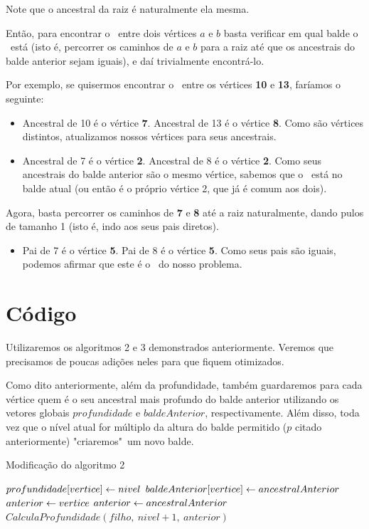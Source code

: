 Note que o ancestral da raiz é naturalmente ela mesma.

Então, para encontrar o \LCA\ entre dois vértices $a$ e $b$ basta verificar em qual balde o \LCA\ está (isto é, percorrer os caminhos de $a$ e $b$ para a raiz até que os ancestrais do balde anterior sejam iguais), e daí trivialmente encontrá-lo.

Por exemplo, se quisermos encontrar o \LCA\ entre os vértices \textbf{10} e \textbf{13}, faríamos o seguinte:

\begin{itemize}
    \item Ancestral de 10 é o vértice \textbf{7}. Ancestral de 13 é o vértice \textbf{8}. Como são vértices distintos, atualizamos nossos vértices para seus ancestrais.
    \item Ancestral de 7 é o vértice \textbf{2}. Ancestral de 8 é o vértice \textbf{2}. Como seus ancestrais do balde anterior são o mesmo vértice, sabemos que o \LCA\ está no balde atual (ou então é o próprio vértice 2, que já é comum aos dois).
\end{itemize}
Agora, basta percorrer os caminhos de \textbf{7} e \textbf{8} até a raiz naturalmente, dando pulos de tamanho 1 (isto é, indo aos seus pais diretos).
\begin{itemize}
    \item Pai de 7 é o vértice \textbf{5}. Pai de 8 é o vértice \textbf{5}. Como seus pais são iguais, podemos afirmar que este é o \LCA\ do nosso problema.
\end{itemize}

\section{Código}

Utilizaremos os algoritmos 2 e 3 demonstrados anteriormente. Veremos que precisamos de poucas adições neles para que fiquem otimizados.

Como dito anteriormente, além da profundidade, também guardaremos para cada vértice quem é o seu ancestral mais profundo do balde anterior utilizando os vetores globais $profundidade$ e $baldeAnterior$, respectivamente. Além disso, toda vez que o nível atual for múltiplo da altura do balde permitido ($p$ citado anteriormente)  "criaremos"\ um novo balde.

\vspace{0.3cm}

\begin{algorithm}[H]
\caption{Modificação do algoritmo 2}
\begin{algorithmic}[1]
    \State $profundidade[vertice] \leftarrow nivel$
    \State $baldeAnterior[vertice] \leftarrow ancestralAnterior$
        \State $anterior \leftarrow vertice$
    \Else
        \State $anterior \leftarrow ancestralAnterior$
    \EndIf
        \State $CalculaProfundidade(filho,\ nivel+1,\ anterior)$
    \EndFor
\EndFunction
\end{algorithmic}
\end{algorithm}

